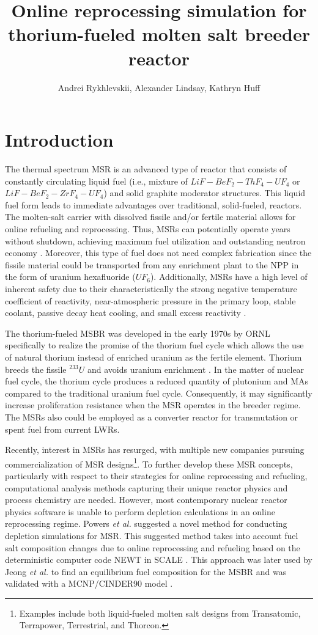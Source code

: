 \documentclass{anstrans}
\title{Online reprocessing simulation for thorium-fueled molten salt breeder 
reactor}
\author{Andrei Rykhlevskii, Alexander Lindsay, Kathryn Huff}
\institute{
        Department of Nuclear, Plasma, and Radiological Engineering, University 
        of Illinois at Urbana-Champaign \break
        Urbana, IL
}
\begin{document}
\section{Introduction}
The thermal spectrum \gls{MSR} is an advanced type of reactor that consists of 
constantly circulating liquid fuel (i.e., mixture of $LiF-BeF_2-ThF_4-UF_4$ or 
$LiF-BeF_2-ZrF_4-UF_4$) and solid graphite moderator structures. This liquid 
fuel form leads to immediate advantages over traditional, 
solid-fueled, reactors. The molten-salt carrier with dissolved 
fissile and/or fertile material allows for online refueling and 
reprocessing. Thus, \glspl{MSR} can potentially operate years without shutdown, 
achieving maximum fuel utilization and outstanding neutron economy 
\cite{leblanc_molten_2010}. Moreover, this type of fuel does not need 
complex fabrication since the fissile material could be transported from any 
enrichment plant to the \gls{NPP} in the form 
of uranium hexafluoride ($UF_6$).  Additionally, \glspl{MSR} have a high level 
of inherent safety due to their characteristically 
the strong negative temperature coefficient of reactivity, near-atmospheric 
pressure in the primary loop, stable coolant, passive decay heat cooling, and 
small excess reactivity \cite{elsheikh_safety_2013}.

The thorium-fueled \gls{MSBR} was developed in the early 1970s by \gls{ORNL} 
specifically to realize the promise of the thorium fuel cycle which allows the 
use of natural thorium instead of enriched uranium as the fertile element. 
Thorium breeds the fissile $^{233}U$ and avoids uranium enrichment 
\cite{robertson_conceptual_1971}. In the matter of nuclear fuel cycle, the 
thorium cycle produces a reduced quantity of plutonium and \glspl{MA} 
compared to the traditional uranium fuel cycle. Consequently, it may 
significantly increase proliferation resistance when the \gls{MSR} operates in the 
breeder regime. The \glspl{MSR} also could be employed as a converter reactor for 
transmutation or spent fuel from current \glspl{LWR}.

Recently, interest in \glspl{MSR} has resurged, with multiple new companies 
pursuing commercialization of \gls{MSR} designs\footnote{Examples include both 
liquid-fueled molten salt designs from Transatomic, Terrapower, Terrestrial, 
and Thorcon.}.
To further develop these \gls{MSR} concepts, particularly with respect to their  
strategies for online reprocessing and refueling, computational analysis methods capturing
their unique reactor physics and process chemistry are needed.
However, most contemporary nuclear reactor physics software is unable to 
perform depletion calculations in an online reprocessing 
regime. Powers \emph{et al.} suggested a novel method for conducting 
depletion simulations for \gls{MSR}. This suggested method takes into account 
fuel salt composition changes due to online 
reprocessing and refueling based on the deterministic computer code NEWT in 
SCALE \cite{powers_new_2013}. This approach was later used by Jeong \emph{et 
al.} to find an equilibrium fuel composition for the \gls{MSBR} and was 
validated with a \gls{MCNP}/CINDER90 model \cite{jeong_equilibrium_2016}. 
\end{document}

